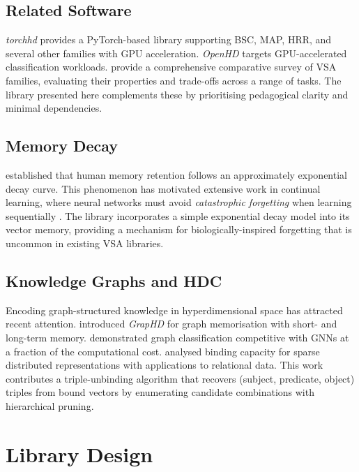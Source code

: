\documentclass[11pt]{article}
\begin{document}
\subsection{Related Software}

\textit{torchhd} \citep{heddes2023} provides a PyTorch-based library supporting BSC, MAP, HRR, and several other families with GPU acceleration. \textit{OpenHD} \citep{kang2022} targets GPU-accelerated classification workloads. \citet{schlegel2022} provide a comprehensive comparative survey of VSA families, evaluating their properties and trade-offs across a range of tasks. The library presented here complements these by prioritising pedagogical clarity and minimal dependencies.

\subsection{Memory Decay}

\citet{ebbinghaus1885} established that human memory retention follows an approximately exponential decay curve. This phenomenon has motivated extensive work in continual learning, where neural networks must avoid \textit{catastrophic forgetting} when learning sequentially \citep{kirkpatrick2017,delange2022}. The library incorporates a simple exponential decay model into its vector memory, providing a mechanism for biologically-inspired forgetting that is uncommon in existing VSA libraries.

\subsection{Knowledge Graphs and HDC}

Encoding graph-structured knowledge in hyperdimensional space has attracted recent attention. \citet{poduval2022} introduced \textit{GrapHD} for graph memorisation with short- and long-term memory. \citet{nunes2022} demonstrated graph classification competitive with GNNs at a fraction of the computational cost. \citet{frady2021} analysed binding capacity for sparse distributed representations with applications to relational data. This work contributes a triple-unbinding algorithm that recovers (subject, predicate, object) triples from bound vectors by enumerating candidate combinations with hierarchical pruning.

\section{Library Design}
\end{document}
